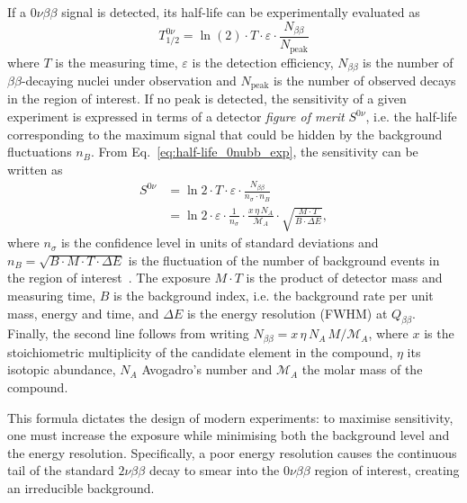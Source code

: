 If a $0\nu\beta\beta$ signal is detected, its half-life can be experimentally evaluated as 
\begin{equation}
    \label{eq:half-life_0nubb_exp}
    T_{1/2}^{0\nu} = \ln(2) \cdot T \cdot \varepsilon \cdot \frac{N_{\beta\beta}}{N_\text{peak}}
\end{equation}
where $T$ is the measuring time, $\varepsilon$ is the detection efficiency, $N_{\beta\beta}$ is the number of $\beta\beta$-decaying nuclei under observation and $N_\text{peak}$ is the number of observed decays in the region of interest. If no peak is detected, the sensitivity of a given experiment is expressed in terms of a detector \textit{figure of merit} $S^{0\nu}$, i.e. the half-life corresponding to the maximum signal that could be hidden by the background fluctuations $n_{B}$. From Eq.~\ref{eq:half-life_0nubb_exp}, the sensitivity can be written as
\begin{equation}
    \label{eq:sensitivity-0nu}
    \begin{aligned}
        S^{0\nu} &= \ln 2 \cdot T \cdot \varepsilon \cdot \frac{N_{\beta\beta}}{n_\sigma \cdot n_B} \\
                 &= \ln 2 \cdot \varepsilon \cdot \frac{1}{n_\sigma} \cdot \frac{x\,\eta\,N_A}{\mathcal{M}_A} \cdot \sqrt{\frac{M \cdot T}{B \cdot \Delta E}},
    \end{aligned}
\end{equation}
where $n_\sigma$ is the confidence level in units of standard deviations and $n_B = \sqrt{B \cdot M \cdot T \cdot \Delta E}$ is the fluctuation of the number of background events in the region of interest~\cite{review-0nu-2015}. The exposure $M \cdot T$ is the product of detector mass and measuring time, $B$ is the background index, i.e. the background rate per unit mass, energy and time, and $\Delta E$ is the energy resolution (FWHM) at $Q_{\beta\beta}$. Finally, the second line follows from writing $N_{\beta\beta} = x\,\eta\,N_A\,M/\mathcal{M}_A$, where $x$ is the stoichiometric multiplicity of the candidate element in the compound, $\eta$ its isotopic abundance, $N_A$ Avogadro's number and $\mathcal{M}_A$ the molar mass of the compound.

This formula dictates the design of modern experiments: to maximise sensitivity, one must increase the exposure while minimising both the background level and the energy resolution. Specifically, a poor energy resolution causes the continuous tail of the standard $2\nu\beta\beta$ decay to smear into the $0\nu\beta\beta$ region of interest, creating an irreducible background.


